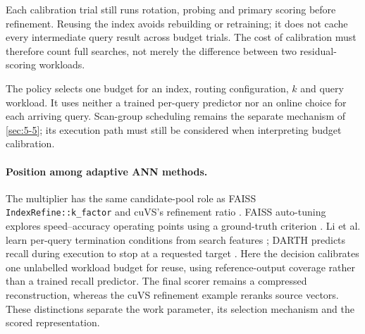 Each calibration trial still runs rotation, probing and primary scoring
before refinement. Reusing the index avoids rebuilding or retraining;
it does not cache every intermediate query result across budget trials.
The cost of calibration must therefore count full searches, not merely
the difference between two residual-scoring workloads.

The policy selects one budget for an index, routing configuration, $k$
and query workload. It uses neither a trained per-query predictor nor
an online choice for each arriving query. Scan-group scheduling remains
the separate mechanism of \cref{sec:5-5}; its execution path must still
be considered when interpreting budget calibration.

\paragraph{Position among adaptive ANN methods.}
The multiplier has the same candidate-pool role as FAISS
\texttt{IndexRefine::k\_factor} and cuVS's refinement ratio
\cite{faiss_refine,cuvs_refinement}. FAISS auto-tuning explores
speed--accuracy operating points using a ground-truth criterion
\cite{faiss_autotune}. Li et al. learn per-query termination conditions
from search features \cite{li_termination}; DARTH predicts recall during
execution to stop at a requested target \cite{darth}.
Here the decision calibrates one unlabelled workload budget for reuse,
using reference-output coverage rather than a trained recall predictor.
The final scorer remains a compressed reconstruction, whereas the cuVS
refinement example reranks source vectors. These distinctions separate
the work parameter, its selection mechanism and the scored representation.
